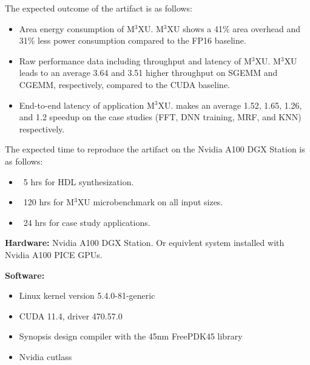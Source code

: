 \documentclass[conference]{IEEEtran}
\newcommand{\MPCMXU}[1]{M$^{3}$XU}
\begin{document}
\artexp
The expected outcome of the artifact is as follows:
\begin{itemize}
    \item Area energy consumption of \MPCMXU{}. 
        \MPCMXU{} shows a 41\% area overhead and 31\% less power consumption compared to the FP16 baseline.
    \item Raw performance data including throughput and latency of \MPCMXU{}.
        \MPCMXU{} leads to an average 3.64\x{} and 3.51\x{} higher throughput on SGEMM and CGEMM, respectively, compared to the CUDA baseline.
    \item End-to-end latency of application \MPCMXU{}.
        \MPMCMXU{} makes an average 1.52\x{}, 1.65\x{}, 1.26\x{}, and 1.2\x{} speedup on the case studies (FFT, DNN training, MRF, and KNN) respectively.
\end{itemize}


\arttime
The expected time to reproduce the artifact on the Nvidia A100 DGX Station is as follows:
\begin{itemize}
    \item ~5 hrs for HDL synthesization.
    \item ~120 hrs for \MPCMXU{} microbenchmark on all input sizes.
    \item ~24 hrs for case study applications.
\end{itemize}



\artin
\noindent\textbf{Hardware:} Nvidia A100 DGX Station. Or equivlent system installed with Nvidia A100 PICE GPUs.

\noindent\textbf{Software:}
\begin{itemize}
    \item Linux kernel version 5.4.0-81-generic
    \item CUDA 11.4, driver 470.57.0
    \item Synopsis design compiler with the 45nm FreePDK45 library
    \item Nvidia cutlass
\end{itemize}
\end{document}
